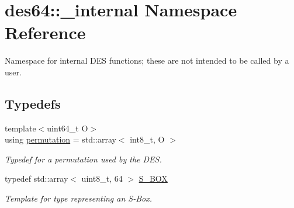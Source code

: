 \hypertarget{namespacedes64_1_1__internal}{}\section{des64\+:\+:\+\_\+internal Namespace Reference}
\label{namespacedes64_1_1__internal}


Namespace for internal D\+ES functions; these are not intended to be called by a user.  


\subsection*{Typedefs}
\begin{DoxyCompactItemize}
\item 
{\footnotesize template$<$uint64\+\_\+t O$>$ }\\using \hyperlink{namespacedes64_1_1__internal_a5b829bc1e22d70ed35b925f8971a88d3}{permutation} = std\+::array$<$ int8\+\_\+t, O $>$
\begin{DoxyCompactList}\small\item\em Typedef for a permutation used by the D\+ES. \end{DoxyCompactList}\item 
typedef std\+::array$<$ uint8\+\_\+t, 64 $>$ \hyperlink{namespacedes64_1_1__internal_a7c6e061269c399077858cb1504a53463}{S\+\_\+\+B\+OX}\hypertarget{namespacedes64_1_1__internal_a7c6e061269c399077858cb1504a53463}{}\label{namespacedes64_1_1__internal_a7c6e061269c399077858cb1504a53463}

\begin{DoxyCompactList}\small\item\em Template for type representing an S-\/\+Box. \end{DoxyCompactList}\end{DoxyCompactItemize}
